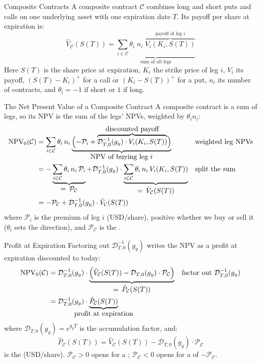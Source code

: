 \documentclass[aspectratio=169,11pt]{beamer}
\newcommand{\Cc}{\mathcal{C}}
\newcommand{\Dc}{\mathcal{D}}
\newcommand{\Pc}{\mathcal{P}}
\begin{document}
\begin{frame}{Composite Contracts}
  A composite contract $\Cc$ combines long and short puts and calls on one
  underlying asset with one expiration date $T$. Its payoff per share at
  expiration is:
  \begin{equation*}
    \hat{V}_{\Cc}(S(T)) = \underbrace{\sum_{i\in\Cc}\theta_{i}\;n_{i}\;\overbrace{V_{i}(K_{i},S(T))}^{\textstyle\text{payoff of leg } i}}_{\textstyle\text{sum of all legs}}
  \end{equation*}
  Here $S(T)$ is the share price at expiration, $K_{i}$ the strike price of leg
  $i$, $V_{i}$ its payoff, $(S(T)-K_{i})^{+}$ for a call or $(K_{i}-S(T))^{+}$ for
  a put, $n_{i}$ its number of contracts, and $\theta_{i}=-1$ if short or $1$ if
  long.
\end{frame}

\begin{frame}{The Net Present Value of a Composite Contract}
  A composite contract is a sum of legs, so its NPV is the sum of the legs'
  NPVs, weighted by $\theta_{i}n_{i}$:
  \begin{align*}
    \operatorname{NPV}_{0}(\Cc) &= \sum_{i\in\Cc}\theta_{i}\,n_{i}\underbrace{\Bigl(-\Pc_{i}+\overbrace{\Dc^{-1}_{T,0}(g_{y})\cdot V_{i}(K_{i},S(T))}^{\textstyle\text{discounted payoff}}\Bigr)}_{\textstyle\text{NPV of buying leg } i} && \text{weighted leg NPVs}\\
    &= -\underbrace{\sum_{i\in\Cc}\theta_{i}\,n_{i}\,\Pc_{i}}_{\textstyle=\,\Pc_{\Cc}}+\Dc^{-1}_{T,0}(g_{y})\cdot\underbrace{\sum_{i\in\Cc}\theta_{i}\,n_{i}\,V_{i}(K_{i},S(T))}_{\textstyle=\,\hat{V}_{\Cc}(S(T))} && \text{split the sum}\\
    &= -\Pc_{\Cc}+\Dc^{-1}_{T,0}(g_{y})\cdot\hat{V}_{\Cc}(S(T))
  \end{align*}
  where $\Pc_{i}$ is the premium of leg $i$ (USD/share), positive whether we buy
  or sell it ($\theta_{i}$ sets the direction), and $\Pc_{\Cc}$ is the
  .
\end{frame}

\begin{frame}{Profit at Expiration}
  Factoring out $\Dc^{-1}_{T,0}(g_{y})$ writes the NPV as a profit at expiration
  discounted to today:
  \begin{align*}
    \operatorname{NPV}_{0}(\Cc) &= \Dc^{-1}_{T,0}(g_{y})\cdot\underbrace{\Bigl(\hat{V}_{\Cc}(S(T))-\Dc_{T,0}(g_{y})\cdot\Pc_{\Cc}\Bigr)}_{\textstyle=\,\hat{P}_{\Cc}(S(T))} && \text{factor out }\Dc^{-1}_{T,0}(g_{y})\\
    &= \Dc^{-1}_{T,0}(g_{y})\cdot\underbrace{\hat{P}_{\Cc}(S(T))}_{\makebox[0pt]{profit at expiration}}
  \end{align*}
  where $\Dc_{T,0}(g_{y})=e^{g_{y}T}$ is the accumulation factor, and:
  \begin{equation*}
    \boxed{\hat{P}_{\Cc}(S(T)) = \hat{V}_{\Cc}(S(T)) - \Dc_{T,0}(g_{y})\cdot\Pc_{\Cc}}
  \end{equation*}
  is the  (USD/share). $\Pc_{\Cc}>0$ opens for a
  ; $\Pc_{\Cc}<0$ opens for a  of $-\Pc_{\Cc}$.
\end{frame}
\end{document}
